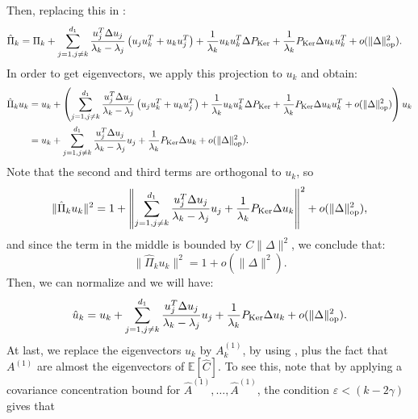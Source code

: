 \documentclass[]{article}
\numberwithin{equation}{section}
\theoremstyle{definition}
\newcommand{\EE}{\mathbb{E}}
\def\op{{\rm op}}
\begin{document}
Then, replacing this in : 
\begin{align}
      \hat{\Pi}_{k}  &= \Pi_{k} + \sum_{j=1, j\not = k}^{d_1} \dfrac{u_{j}^T \Delta u_{j}}{\lambda_{k} - \lambda_{j}}\left ( u_{j} u_{k}^T + u_{k} u_{j}^T \right ) + \dfrac{1}{\lambda_{k}} u_{k} u_{k}^T \Delta P_{\mathrm{Ker}} +  \dfrac{1}{\lambda_{k}} P_{\mathrm{Ker}} \Delta u_{k} u_{k}^T + o(\| \Delta\|_\op^2). 
     \label{eq:expansion_projection_k_2}
\end{align}
In order to get eigenvectors, we apply this projection to $u_{k}$ and obtain: 
\begin{align}
    \hat{\Pi}_{k}u_{k} & =  u_{k} + \left ( \sum_{j=1, j\not = k}^{d_1} \dfrac{u_{j}^T \Delta u_{j}}{\lambda_{k} - \lambda_{j}}\left ( u_{j} u_{k}^T + u_{k} u_{j}^T \right ) + \dfrac{1}{\lambda_{k}} u_{k} u_{k}^T \Delta P_{\mathrm{Ker}} +  \dfrac{1}{\lambda_{k}} P_{\mathrm{Ker}} \Delta u_{k} u_{k}^T + o(\| \Delta\|_\op^2) \right ) u_{k} \\
    & =  u_{k}  + \sum_{j=1, j\not = k}^{d_1} \dfrac{u_{j}^T \Delta u_{j}}{\lambda_{k} - \lambda_{j}} u_{j} + \dfrac{1}{\lambda_{k}}P_{\mathrm{Ker}} \Delta u_{k} + o(\| \Delta\|_\op^2). 
    \label{eq:projection_hat_u_k}
\end{align}
Note that the second and third terms are orthogonal to $u_{k}$, so 
\begin{equation}
    \|\hat{\Pi}_{k} u_{k}\|^{2} = 1 + \left \|\sum_{j=1, j\not = k}^{d_1} \dfrac{u_{j}^T \Delta u_{j}}{\lambda_{k} - \lambda_{j}} u_{j} + \dfrac{1}{\lambda_{k}}P_{\mathrm{Ker}} \Delta u_{k} \right \|^{2}  + o(\| \Delta \|^{2}_\op) ,
\end{equation}
and since the term in the middle is bounded by $C\| \Delta\|^{2}$, we conclude that: 
\begin{equation}
    \|\hat{\Pi}_{k} u_{k}\|^{2} = 1 + o (\| \Delta\|^{2}). 
\end{equation}
Then, we can normalize  and we will have: 
\begin{equation}
    \hat{u}_{k} = u_{k }+\sum_{j=1, j\not = k}^{d_1} \dfrac{u_{j}^T \Delta u_{j}}{\lambda_{k} - \lambda_{j}} u_{j} + \dfrac{1}{\lambda_{k}}P_{\mathrm{Ker}} \Delta u_{k} + o(\| \Delta\|_\op^2). 
    \label{eq:eigenvector_perturbation_identity}
\end{equation}
At last, we replace the eigenvectors $u_{k}$ by $A^{(1)}_{k}$, by using 
, plus the fact that $A^{(1)}$ are almost the eigenvectors of $\EE \left [ \hat{C}\right ]$. To see this, note that by applying a covariance concentration bound \cite{V10} for $\hat{A}^{(1)}, \dots, \hat{A}^{(1)}$, the condition $\varepsilon < (k - 2\gamma) $ gives that
\end{document}
